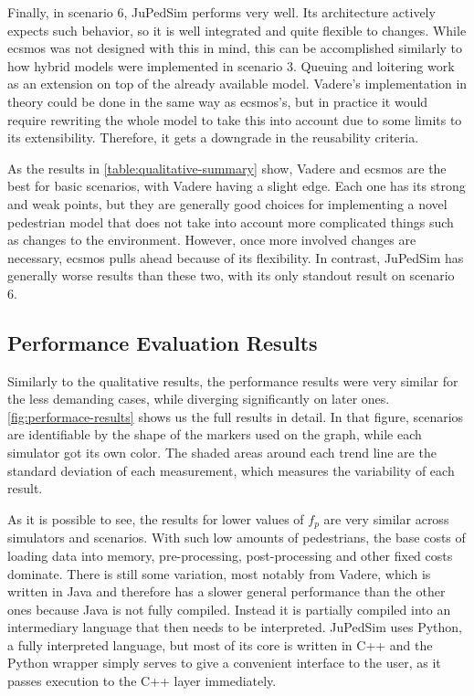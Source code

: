 \documentclass[twoside, 11pt]{article}
\begin{document}
Finally, in scenario 6, JuPedSim performs very well. Its architecture actively expects such behavior, so it is well integrated and quite flexible to changes. While \gls{ecsmos} was not designed with this in mind, this can be accomplished similarly to how hybrid models were implemented in scenario 3. Queuing and loitering work as an extension on top of the already available model. Vadere's implementation in theory could be done in the same way as \gls{ecsmos}'s, but in practice it would require rewriting the whole model to take this into account due to some limits to its extensibility. Therefore, it gets a downgrade in the reusability criteria.

As the results in  \autoref{table:qualitative-summary} show, Vadere and \gls{ecsmos} are the best for basic scenarios, with Vadere having a slight edge. Each one has its strong and weak points, but they are generally good choices for implementing a novel pedestrian model that does not take into account more complicated things such as changes to the environment. However, once more involved changes are necessary, \gls{ecsmos} pulls ahead because of its flexibility. In contrast, JuPedSim has generally worse results than these two, with its only standout result on scenario 6.


\subsection{Performance Evaluation Results}

Similarly to the qualitative results, the performance results were very similar for the less demanding cases, while diverging significantly on later ones. \autoref{fig:performace-results} shows us the full results in detail. In that figure, scenarios are identifiable by the shape of the markers used on the graph, while each simulator got its own color. The shaded areas around each trend line are the standard deviation of each measurement, which measures the variability of each result.

As it is possible to see, the results for lower values of $f_p$ are very similar across simulators and scenarios. With such low amounts of pedestrians, the base costs of loading data into memory, pre-processing, post-processing and other fixed costs dominate. There is still some variation, most notably from Vadere, which is written in Java and therefore has a slower general performance than the other ones because Java is not fully compiled. Instead it is partially compiled into an intermediary language that then needs to be interpreted. JuPedSim uses Python, a fully interpreted language, but most of its core is written in C++ and the Python wrapper simply serves to give a convenient interface to the user, as it passes execution to the C++ layer immediately.
\end{document}
